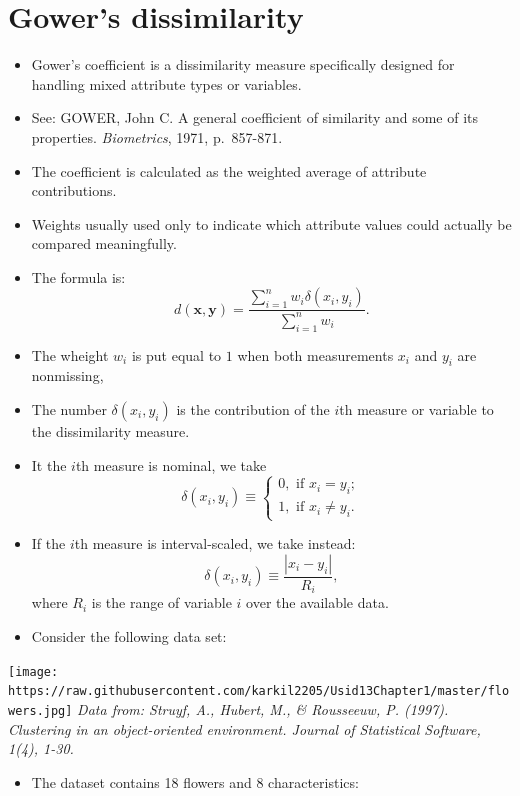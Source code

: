 \documentclass[
]{article}
\providecommand{\tightlist}{%
  \setlength{\itemsep}{0pt}\setlength{\parskip}{0pt}}
\begin{document}
\hypertarget{gowers-dissimilarity}{%
\section{Gower's dissimilarity}\label{gowers-dissimilarity}}

\begin{itemize}
\tightlist
\item
  Gower's coefficient is a dissimilarity measure specifically designed
  for handling mixed attribute types or variables.
\item
  See: GOWER, John C. A general coefficient of similarity and some of
  its properties. \emph{Biometrics}, 1971, p.~857-871.
\item
  The coefficient is calculated as the weighted average of attribute
  contributions.
\item
  Weights usually used only to indicate which attribute values could
  actually be compared meaningfully.
\item
  The formula is: \[
  d(\mathbf{x},\mathbf{y})=\frac{\sum_{i=1}^n w_i \delta(x_i,y_i)}{\sum_{i=1}^n w_i}.
  \]
\item
  The wheight \(w_i\) is put equal to \(1\) when both measurements
  \(x_i\) and \(y_i\) are nonmissing,
\item
  The number \(\delta(x_i,y_i)\) is the contribution of the \(i\)th
  measure or variable to the dissimilarity measure.
\item
  It the \(i\)th measure is nominal, we take\\
  \[
  \delta(x_i,y_i)\equiv \begin{cases}0,
  \text{ if } x_i=y_i;\\1,\text{ if } x_i \neq y_i.\end{cases}
  \]
\item
  If the \(i\)th measure is interval-scaled, we take instead: \[
  \delta(x_i,y_i)\equiv \frac{|x_i-y_i|}{R_i},
  \] where \(R_i\) is the range of variable \(i\) over the available
  data.
\item
  Consider the following data set:
\end{itemize}

\texttt{[image: https://raw.githubusercontent.com/karkil2205/Usid13Chapter1/master/flowers.jpg]}
\emph{Data from: Struyf, A., Hubert, M., \& Rousseeuw, P. (1997).
Clustering in an object-oriented environment. \emph{Journal of
Statistical Software}, \emph{1}(4), 1-30.}

\begin{itemize}
\tightlist
\item
  The dataset contains 18 flowers and 8 characteristics:
\end{itemize}
\end{document}
